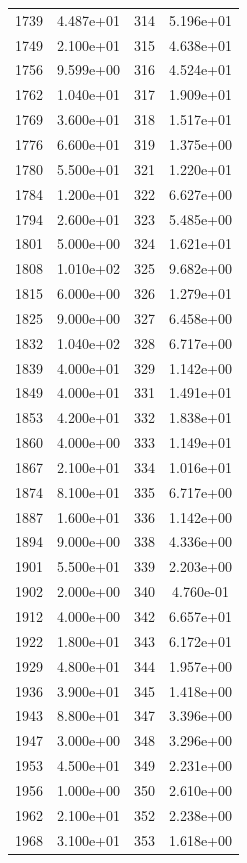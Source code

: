 \documentclass[12pt]{article}
\begin{document}
\begin{longtable}{@{}cccc@{}}
1739 & 4.487e+01 & 314 & 5.196e+01 \\
1749 & 2.100e+01 & 315 & 4.638e+01 \\
1756 & 9.599e+00 & 316 & 4.524e+01 \\
1762 & 1.040e+01 & 317 & 1.909e+01 \\
1769 & 3.600e+01 & 318 & 1.517e+01 \\
1776 & 6.600e+01 & 319 & 1.375e+00 \\
1780 & 5.500e+01 & 321 & 1.220e+01 \\
1784 & 1.200e+01 & 322 & 6.627e+00 \\
1794 & 2.600e+01 & 323 & 5.485e+00 \\
1801 & 5.000e+00 & 324 & 1.621e+01 \\
1808 & 1.010e+02 & 325 & 9.682e+00 \\
1815 & 6.000e+00 & 326 & 1.279e+01 \\
1825 & 9.000e+00 & 327 & 6.458e+00 \\
1832 & 1.040e+02 & 328 & 6.717e+00 \\
1839 & 4.000e+01 & 329 & 1.142e+00 \\
1849 & 4.000e+01 & 331 & 1.491e+01 \\
1853 & 4.200e+01 & 332 & 1.838e+01 \\
1860 & 4.000e+00 & 333 & 1.149e+01 \\
1867 & 2.100e+01 & 334 & 1.016e+01 \\
1874 & 8.100e+01 & 335 & 6.717e+00 \\
1887 & 1.600e+01 & 336 & 1.142e+00 \\
1894 & 9.000e+00 & 338 & 4.336e+00 \\
1901 & 5.500e+01 & 339 & 2.203e+00 \\
1902 & 2.000e+00 & 340 & 4.760e-01 \\
1912 & 4.000e+00 & 342 & 6.657e+01 \\
1922 & 1.800e+01 & 343 & 6.172e+01 \\
1929 & 4.800e+01 & 344 & 1.957e+00 \\
1936 & 3.900e+01 & 345 & 1.418e+00 \\
1943 & 8.800e+01 & 347 & 3.396e+00 \\
1947 & 3.000e+00 & 348 & 3.296e+00 \\
1953 & 4.500e+01 & 349 & 2.231e+00 \\
1956 & 1.000e+00 & 350 & 2.610e+00 \\
1962 & 2.100e+01 & 352 & 2.238e+00 \\
1968 & 3.100e+01 & 353 & 1.618e+00 \\

\end{longtable}
\end{document}

